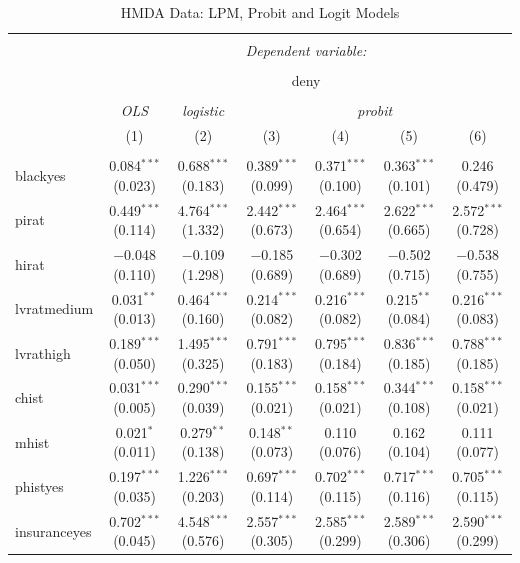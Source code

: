 \documentclass[]{book}
\theoremstyle{definition}
\theoremstyle{definition}
\theoremstyle{definition}
\theoremstyle{remark}
\begin{document}
\begin{table} \centering 
  \caption{\label{tab:hmdad} HMDA Data: LPM, Probit and Logit Models} 
  \label{} 
\begin{tabular}{@{\extracolsep{-5pt}}lcccccc} 
\\[-1.8ex]\hline 
\hline \\[-1.8ex] 
 & \multicolumn{6}{c}{\textit{Dependent variable:}} \\ 
\cline{2-7} 
\\[-1.8ex] & \multicolumn{6}{c}{deny} \\ 
\\[-1.8ex] & \textit{OLS} & \textit{logistic} & \multicolumn{4}{c}{\textit{probit}} \\ 
 & (1) & (2) & (3) & (4) & (5) & (6) \\ 
\hline \\[-1.8ex] 
 blackyes & 0.084$^{***}$ (0.023) & 0.688$^{***}$ (0.183) & 0.389$^{***}$ (0.099) & 0.371$^{***}$ (0.100) & 0.363$^{***}$ (0.101) & 0.246 (0.479) \\ 
  pirat & 0.449$^{***}$ (0.114) & 4.764$^{***}$ (1.332) & 2.442$^{***}$ (0.673) & 2.464$^{***}$ (0.654) & 2.622$^{***}$ (0.665) & 2.572$^{***}$ (0.728) \\ 
  hirat & $-$0.048 (0.110) & $-$0.109 (1.298) & $-$0.185 (0.689) & $-$0.302 (0.689) & $-$0.502 (0.715) & $-$0.538 (0.755) \\ 
  lvratmedium & 0.031$^{**}$ (0.013) & 0.464$^{***}$ (0.160) & 0.214$^{***}$ (0.082) & 0.216$^{***}$ (0.082) & 0.215$^{**}$ (0.084) & 0.216$^{***}$ (0.083) \\ 
  lvrathigh & 0.189$^{***}$ (0.050) & 1.495$^{***}$ (0.325) & 0.791$^{***}$ (0.183) & 0.795$^{***}$ (0.184) & 0.836$^{***}$ (0.185) & 0.788$^{***}$ (0.185) \\ 
  chist & 0.031$^{***}$ (0.005) & 0.290$^{***}$ (0.039) & 0.155$^{***}$ (0.021) & 0.158$^{***}$ (0.021) & 0.344$^{***}$ (0.108) & 0.158$^{***}$ (0.021) \\ 
  mhist & 0.021$^{*}$ (0.011) & 0.279$^{**}$ (0.138) & 0.148$^{**}$ (0.073) & 0.110 (0.076) & 0.162 (0.104) & 0.111 (0.077) \\ 
  phistyes & 0.197$^{***}$ (0.035) & 1.226$^{***}$ (0.203) & 0.697$^{***}$ (0.114) & 0.702$^{***}$ (0.115) & 0.717$^{***}$ (0.116) & 0.705$^{***}$ (0.115) \\ 
  insuranceyes & 0.702$^{***}$ (0.045) & 4.548$^{***}$ (0.576) & 2.557$^{***}$ (0.305) & 2.585$^{***}$ (0.299) & 2.589$^{***}$ (0.306) & 2.590$^{***}$ (0.299) \\ 

\end{tabular}
\end{table}
\end{document}

